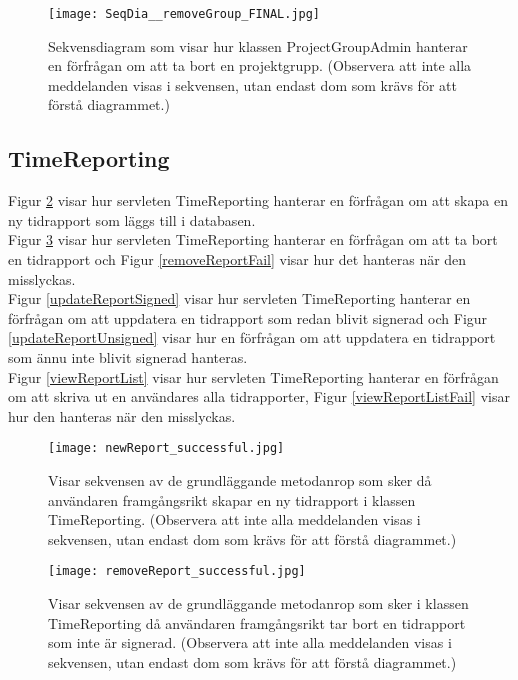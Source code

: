\documentclass[a4paper]{article}
\begin{document}
\begin{figure}[h!]
\centering
\texttt{[image: SeqDia\_\_removeGroup\_FINAL.jpg]}
\caption{Sekvensdiagram som visar hur klassen ProjectGroupAdmin hanterar en förfrågan om att ta bort en projektgrupp. (Observera att inte alla meddelanden visas i sekvensen, utan endast dom som krävs för att förstå diagrammet.)\label{removeGroup}}
\end{figure}


\subsection{TimeReporting}
Figur \ref{newReport} visar hur servleten TimeReporting hanterar en förfrågan om att skapa en ny tidrapport som läggs till i databasen.\\
Figur \ref{removeReport} visar hur servleten TimeReporting hanterar en förfrågan om att ta bort en tidrapport och Figur \ref{removeReportFail} visar hur det hanteras när den misslyckas.\\
Figur \ref{updateReportSigned} visar hur servleten TimeReporting hanterar en förfrågan om att uppdatera en tidrapport som redan blivit signerad och Figur \ref{updateReportUnsigned} visar hur en förfrågan om att uppdatera en tidrapport som ännu inte blivit signerad hanteras.\\
Figur \ref{viewReportList} visar hur servleten TimeReporting hanterar en förfrågan om att skriva ut en användares alla tidrapporter, Figur \ref{viewReportListFail} visar hur den hanteras när den misslyckas.

\begin{figure}[h!]
\centering
\texttt{[image: newReport\_successful.jpg]}
\caption{Visar sekvensen av de grundläggande metodanrop som sker då användaren framgångsrikt skapar en ny tidrapport i klassen TimeReporting. (Observera att inte alla meddelanden visas i sekvensen, utan endast dom som krävs för att förstå diagrammet.) \label{newReport}}
\end{figure}

\begin{figure}[h!]
\centering
\texttt{[image: removeReport\_successful.jpg]}
\caption{Visar sekvensen av de grundläggande metodanrop som sker i klassen TimeReporting då användaren framgångsrikt tar bort en tidrapport som inte är signerad. (Observera att inte alla meddelanden visas i sekvensen, utan endast dom som krävs för att förstå diagrammet.) \label{removeReport}}
\end{figure}
\end{document}
